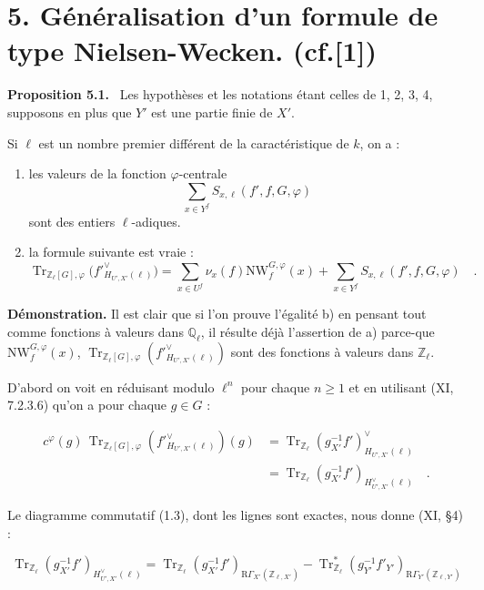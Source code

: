 \documentclass[11pt]{article}
\newenvironment{statement}[1]{\par\medskip\noindent\textbf{#1.}\ }{\par\medskip}
\newcommand{\R}{\mathrm{R}}\newcommand{\RHomCore}{\mathrm{RHom}}
\newcommand{\Q}{\mathbb{Q}}
\providecommand{\Tr}{\operatorname{Tr}}
\providecommand{\Tr}{\operatorname{Tr}}
\providecommand{\Tr}{\operatorname{Tr}}
\providecommand{\R}{\mathrm R}
\providecommand{\Tr}{\operatorname{Tr}}
\providecommand{\bZ}{\mathbb Z}
\providecommand{\Tr}{\operatorname{Tr}}
\begin{document}
\section*{5. Généralisation d'un formule de type Nielsen-Wecken. {\normalfont (cf.[1])}}

\begin{statement}{Proposition 5.1}
Les hypothèses et les notations étant celles de 1, 2, 3, 4, supposons en plus que $Y'$ est une partie finie de $X'$.

Si $\ell$ est un nombre premier différent de la caractéristique de $k$, on a :
\begin{enumerate}[label=\alph*)]
\item les valeurs de la fonction $\varphi$-centrale
\[
\sum_{x\in Y^f} S_{x,\ell}(f',f,G,\varphi)
\]
sont des entiers $\ell$-adiques.
\item la formule suivante est vraie :
\begin{equation}\tag{5.1.1}
\Tr_{\bZ_\ell[G],\varphi}\bigl(f'^\vee_{H_{U',X'}(\ell)}\bigr)
= \sum_{x\in U^f}\nu_x(f)\mathrm{NW}^{G,\varphi}_f(x)+\sum_{x\in Y^f}S_{x,\ell}(f',f,G,\varphi) \quad .
\end{equation}
\end{enumerate}
\end{statement}

\noindent
\textbf{Démonstration.} Il est clair que si l'on prouve l'égalité b) en pensant tout comme fonctions à valeurs dans $\Q_\ell$, il résulte déjà l'assertion de a) parce-que $\mathrm{NW}^{G,\varphi}_{f}(x)$, $\Tr_{\bZ_\ell[G],\varphi}(f'^\vee_{H_{U',X'}(\ell)})$ sont des fonctions à valeurs dans $\bZ_\ell$.

D'abord on voit en réduisant modulo $\ell^n$ pour chaque $n \geq 1$ et en utilisant (XI, 7.2.3.6) qu'on a pour chaque $g \in G$ :

\begin{equation}\tag{5.2}
\begin{aligned}
c^\varphi(g) \, \Tr_{\bZ_\ell[G],\varphi}(f'^\vee_{H_{U',X'}(\ell)})(g)
&= \Tr_{\bZ_\ell}(g_{X'}^{-1}f')^\vee_{H_{U',X'}(\ell)}\\
&= \Tr_{\bZ_\ell}(g_{X'}^{-1}f')_{H^\vee_{U',X'}(\ell)} \quad .
\end{aligned}
\end{equation}

Le diagramme commutatif (1.3), dont les lignes sont exactes, nous donne (XI, \S4) :

\begin{equation}\tag{5.3}
\Tr_{\bZ_\ell}(g_{X'}^{-1}f')_{H^\vee_{U',X'}(\ell)} = \Tr_{\bZ_\ell}(g_{X'}^{-1}f')_{\R\Gamma_{X'}(\bZ_{\ell,X'})} - \Tr^*_{\bZ_\ell}(g_{Y'}^{-1}f'_{Y'})_{\R\Gamma_{Y'}(\bZ_{\ell,Y'})}
\end{equation}
\end{document}
